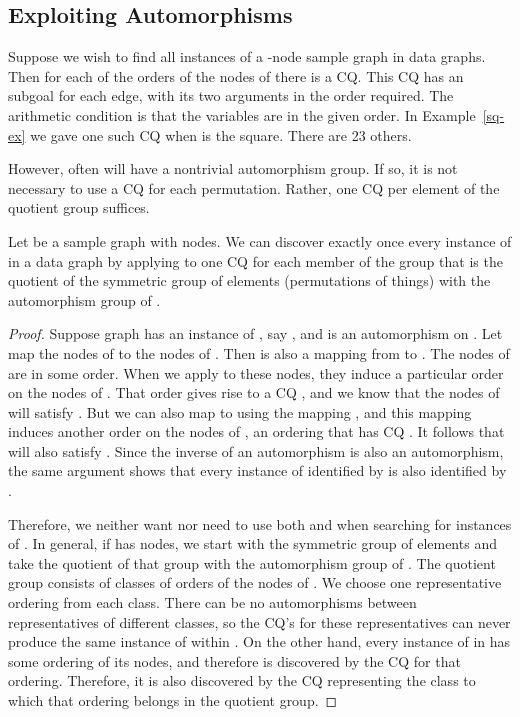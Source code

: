 \subsection{Exploiting Automorphisms}
\label{cq-perm-subsect}

Suppose we wish to find all instances of a -node sample graph  in data graphs.  Then for each of the  orders of the nodes of  there is a CQ.  This CQ has an  subgoal for each edge, with its two arguments in the order required.  The arithmetic condition is that the variables are in the given order.
In Example~\ref{sq-ex} we gave one such CQ when  is the square.  There are 23 others.

However, often  will have a nontrivial automorphism group.  If so, it is not necessary to use a CQ for each permutation.  Rather, one CQ per element of the quotient group suffices.

\begin{theorem}\label{automorphism-th}
Let  be a sample graph with  nodes. We can discover exactly once every instance of  in a data graph  by applying to  one CQ for each member of the group that is the quotient of the symmetric group of  elements (permutations of  things) with the automorphism group of .
\end{theorem}

\begin{proof}
Suppose graph  has an instance of , say , and  is an automorphism on .  Let  map the nodes of  to the nodes of .  Then  is also a mapping from  to .  The nodes of  are in some order.  When we apply  to these nodes, they induce a particular order on the nodes of .   That order gives rise to a CQ , and we know that the nodes of  will satisfy .  But we can also map  to  using the mapping , and this mapping induces another order on the nodes of , an ordering that has CQ .  It follows that  will also satisfy .  Since the inverse of an automorphism is also an automorphism, the same argument shows that every instance of  identified by  is also identified by .

Therefore, we neither want nor need to use both  and  when searching for instances of .  In general, if  has  nodes, we start with the symmetric group of  elements and take the quotient of that group with the automorphism group of .  The quotient group consists of classes of orders of the nodes of .  We choose one representative ordering from each class.  There can be no automorphisms between representatives of different classes, so the CQ's for these representatives can never produce the same instance of  within .  On the other hand, every instance of  in  has some ordering of its nodes, and therefore is discovered by the CQ for that ordering.  Therefore, it is also discovered by the CQ representing the class to which that ordering belongs in the quotient group.
\end{proof}

